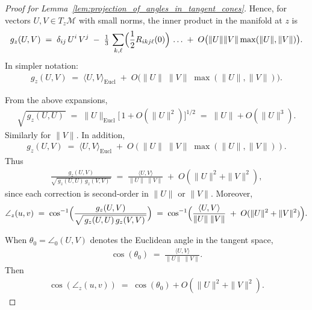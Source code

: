 \begin{proof}[Proof for Lemma~\ref{lem:projection_of_angles_in_tangent_cones}]
    Hence, for vectors \(U,V\in T_z\mathcal{M}\) with small norms, the inner product in the manifold at \(z\) is
    \begin{align*}
        g_z(U,V)
        \;=\;
        \delta_{ij}\,U^i\,V^j
        \;-\;
        \tfrac13\,\sum_{k,\ell}\Bigl(\frac12R_{i k j \ell}(0)\Bigr)\,\dots
        \;+\;
        O\bigl(\|U\|\|V\|\max(\|U\|,\|V\|)\bigr).
    \end{align*}
    In simpler notation:
    \begin{align*}
        g_z(U,V)
        \;=\;
        \langle U,V\rangle_{\mathrm{Eucl}}
        \;+\;
        O\bigl(\|U\|\;\|V\|\;\max(\|U\|,\|V\|)\bigr).
    \end{align*}
    
    From the above expansions,
    \begin{align*}
        \sqrt{\,g_z(U,U)\,}
           \;=\;
           \|U\|_{\mathrm{Eucl}}
           \bigl[\,1 + O(\|U\|^2)\bigr]^{1/2}
           \;=\;
           \|U\|
           +O(\|U\|^3).
    \end{align*}
    Similarly for \(\|V\|\).
    In addition,
    \begin{align*}
        g_z(U,V)
       \;=\;
       \langle U,V\rangle_{\mathrm{Eucl}}
       \;+\;
       O(\|U\|\;\|V\|\;\max(\|U\|,\|V\|)).
    \end{align*}
    Thus
    \begin{align*}
        \frac{g_z(U,V)}{\sqrt{\,g_z(U,U)\,g_z(V,V)\,}}
        \;=\;
        \frac{\langle U,V\rangle}{\|U\|\;\|V\|}
        \;+\;
        O(\|U\|^2 + \|V\|^2),
    \end{align*}
    since each correction is second‐order in \(\|U\|\) or \(\|V\|\). 
    Moreover,
    \begin{align*}
        \angle_z(u,v)
        \;=\;
        \cos^{-1}\Bigl(\frac{g_z(U,V)}{\sqrt{\,g_z(U,U)\,g_z(V,V)\,}}\Bigr)
        \;=\;
        \cos^{-1}\Bigl(
         \frac{\langle U,V\rangle}{\|U\|\;\|V\|}
         \;+\;
         O(\|U\|^2+\|V\|^2)
        \Bigr).
    \end{align*}

   When \(\theta_0 = \angle_0(U,V)\) denotes the Euclidean angle in the tangent space,
   \begin{align*}
       \cos(\theta_0)
       \;=\;
       \frac{\langle U,V\rangle}{\|U\|\;\|V\|}.
   \end{align*}
   Then
   \begin{align*}
       \cos(\angle_z(u,v))
       \;=\;
       \cos(\theta_0) + O(\|U\|^2 + \|V\|^2).
   \end{align*}


\end{proof}
